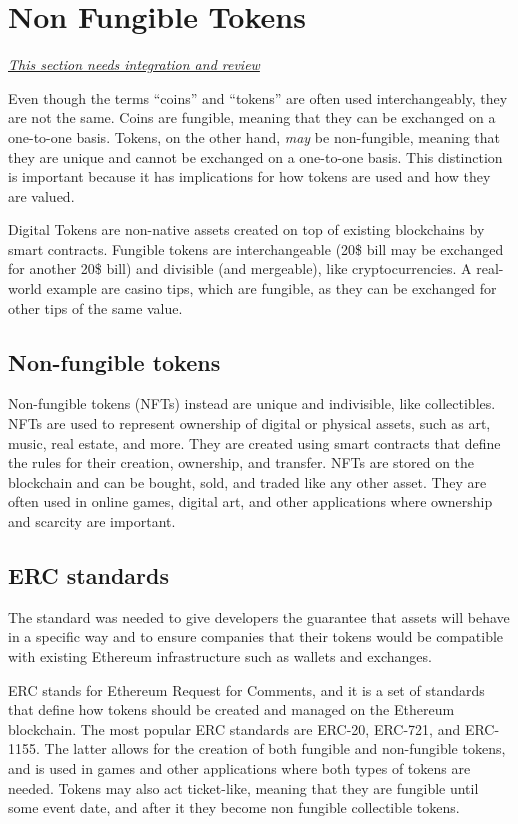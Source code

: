 \chapter{Non Fungible Tokens}
{\large \center \ul{\textit{This section needs integration and review}}}

Even though the terms ``coins'' and ``tokens'' are often used interchangeably, they are not the same. Coins are fungible, meaning that they can be exchanged on a one-to-one basis. Tokens, on the other hand, \textit{may} be non-fungible, meaning that they are unique and cannot be exchanged on a one-to-one basis. This distinction is important because it has implications for how tokens are used and how they are valued.

Digital Tokens are non-native assets created on top of existing blockchains by smart contracts. Fungible tokens are interchangeable (20\$ bill may be exchanged for another 20\$ bill) and divisible (and mergeable), like cryptocurrencies.
A real-world example are casino tips, which are fungible, as they can be exchanged for other tips of the same value. 

\section{Non-fungible tokens}

Non-fungible tokens (NFTs) instead are unique and indivisible, like collectibles. NFTs are used to represent ownership of digital or physical assets, such as art, music, real estate, and more. They are created using smart contracts that define the rules for their creation, ownership, and transfer. NFTs are stored on the blockchain and can be bought, sold, and traded like any other asset. They are often used in online games, digital art, and other applications where ownership and scarcity are important.

\section{ERC standards}
The standard was needed to give developers the guarantee that assets will behave in a specific way and to ensure companies
that their tokens would be compatible with existing
Ethereum infrastructure such as wallets and exchanges.

ERC stands for Ethereum Request for Comments, and it is a set of standards that define how tokens should be created and managed on the Ethereum blockchain. The most popular ERC standards are ERC-20, ERC-721, and ERC-1155.
The latter allows for the creation of both fungible and non-fungible tokens, and is used in games and other applications where both types of tokens are needed. Tokens may also act ticket-like, meaning that they are fungible until some event date, and after it they become non fungible collectible tokens.


